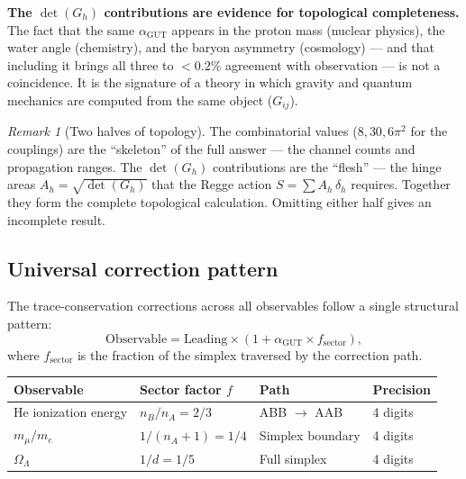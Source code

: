 \documentclass[12pt]{article}
\theoremstyle{remark}
\newtheorem{remark}[theorem]{Remark}
\theoremstyle{definition}
\begin{document}
\textbf{The $\det(G_h)$ contributions are evidence for topological completeness.} The fact that the same $\alpha_\text{GUT}$ appears in the proton mass (nuclear physics), the water angle (chemistry), and the baryon asymmetry (cosmology) --- and that including it brings all three to $< 0.2\%$ agreement with observation --- is not a coincidence. It is the signature of a theory in which gravity and quantum mechanics are computed from the same object ($G_{ij}$).

\begin{remark}[Two halves of topology]
The combinatorial values ($8, 30, 6\pi^2$ for the couplings) are the ``skeleton'' of the full answer --- the channel counts and propagation ranges. The $\det(G_h)$ contributions are the ``flesh'' --- the hinge areas $A_h = \sqrt{\det(G_h)}$ that the Regge action $S = \sum A_h\,\delta_h$ requires. Together they form the complete topological calculation. Omitting either half gives an incomplete result.
\end{remark}

\subsection{Universal correction pattern}
\label{sec:universal_correction}

The trace-conservation corrections across all observables follow a single structural pattern:
\begin{equation}
\boxed{\text{Observable} = \text{Leading} \times \left(1 + \alpha_\mathrm{GUT} \times f_\mathrm{sector}\right),}
\end{equation}
where $f_\mathrm{sector}$ is the fraction of the simplex traversed by the correction path.

\begin{center}
\begin{tabular}{llll}
\toprule
Observable & Sector factor $f$ & Path & Precision \\
\midrule
He ionization energy & $n_B/n_A = 2/3$ & ABB $\to$ AAB & 4 digits \\
$m_\mu/m_e$ & $1/(n_A+1) = 1/4$ & Simplex boundary & 4 digits \\
$\Omega_\Lambda$ & $1/d = 1/5$ & Full simplex & 4 digits \\
\bottomrule
\end{tabular}
\end{center}
\end{document}
